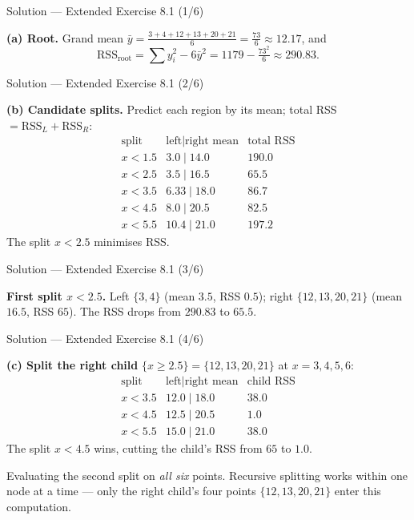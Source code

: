 \documentclass[aspectratio=169,11pt]{beamer}
\begin{document}
\begin{frame}{Solution --- Extended Exercise 8.1 (1/6)}
\begin{solutionbox}
\textbf{(a) Root.} Grand mean $\bar y=\frac{3+4+12+13+20+21}{6}=\frac{73}{6}\approx12.17$, and
\[ \mathrm{RSS}_{\text{root}}=\textstyle\sum y_i^2 - 6\bar y^2 = 1179-\tfrac{73^2}{6}\approx 290.83. \]
\end{solutionbox}
\end{frame}

\begin{frame}{Solution --- Extended Exercise 8.1 (2/6)}
\begin{solutionbox}
\textbf{(b) Candidate splits.} Predict each region by its mean; total RSS $=\mathrm{RSS}_L+\mathrm{RSS}_R$:
\[
\begin{array}{c|c|c}
\text{split} & \text{left}\mid\text{right mean} & \text{total RSS}\\\hline
x<1.5 & 3.0\mid14.0 & 190.0\\
x<2.5 & 3.5\mid16.5 & \mathbf{65.5}\\
x<3.5 & 6.33\mid18.0 & 86.7\\
x<4.5 & 8.0\mid20.5 & 82.5\\
x<5.5 & 10.4\mid21.0 & 197.2
\end{array}
\]
The split $x<2.5$ minimises RSS.
\end{solutionbox}
\end{frame}

\begin{frame}{Solution --- Extended Exercise 8.1 (3/6)}
\begin{solutionbox}
\textbf{First split $x<2.5$.} Left $\{3,4\}$ (mean $3.5$, RSS $0.5$); right $\{12,13,20,21\}$ (mean $16.5$, RSS $65$). The RSS drops from $290.83$ to $65.5$.
\end{solutionbox}
\end{frame}

\begin{frame}{Solution --- Extended Exercise 8.1 (4/6)}
\begin{solutionbox}
\medskip
\textbf{(c) Split the right child} $\{x\ge2.5\}=\{12,13,20,21\}$ at $x=3,4,5,6$:
\[
\begin{array}{c|c|c}
\text{split} & \text{left}\mid\text{right mean} & \text{child RSS}\\\hline
x<3.5 & 12.0\mid18.0 & 38.0\\
x<4.5 & 12.5\mid20.5 & \mathbf{1.0}\\
x<5.5 & 15.0\mid21.0 & 38.0
\end{array}
\]
The split $x<4.5$ wins, cutting the child's RSS from $65$ to $1.0$.
\end{solutionbox}
\begin{mistake}
Evaluating the second split on \emph{all six} points. Recursive splitting works within one node at a time --- only the right child's four points $\{12,13,20,21\}$ enter this computation.
\end{mistake}
\end{frame}
\end{document}
